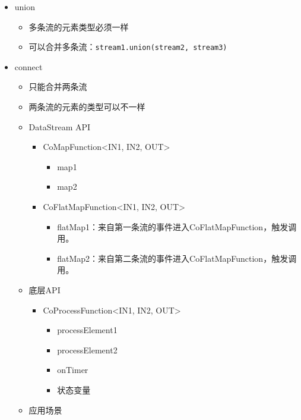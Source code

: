 \begin{itemize}
\tightlist
\item
  union

  \begin{itemize}
  \tightlist
  \item
    多条流的元素类型必须一样
  \item
    可以合并多条流：\texttt{stream1.union(stream2,\ stream3)}
  \end{itemize}
\item
  connect

  \begin{itemize}
  \tightlist
  \item
    只能合并两条流
  \item
    两条流的元素的类型可以不一样
  \item
    DataStream API

    \begin{itemize}
    \tightlist
    \item
      CoMapFunction\textless IN1, IN2, OUT\textgreater{}

      \begin{itemize}
      \tightlist
      \item
        map1
      \item
        map2
      \end{itemize}
    \item
      CoFlatMapFunction\textless IN1, IN2, OUT\textgreater{}

      \begin{itemize}
      \tightlist
      \item
        flatMap1：来自第一条流的事件进入CoFlatMapFunction，触发调用。
      \item
        flatMap2：来自第二条流的事件进入CoFlatMapFunction，触发调用。
      \end{itemize}
    \end{itemize}
  \item
    底层API

    \begin{itemize}
    \tightlist
    \item
      CoProcessFunction\textless IN1, IN2, OUT\textgreater{}

      \begin{itemize}
      \tightlist
      \item
        processElement1
      \item
        processElement2
      \item
        onTimer
      \item
        状态变量
      \end{itemize}
    \end{itemize}
  \item
    应用场景


\end{itemize}
\end{itemize}
